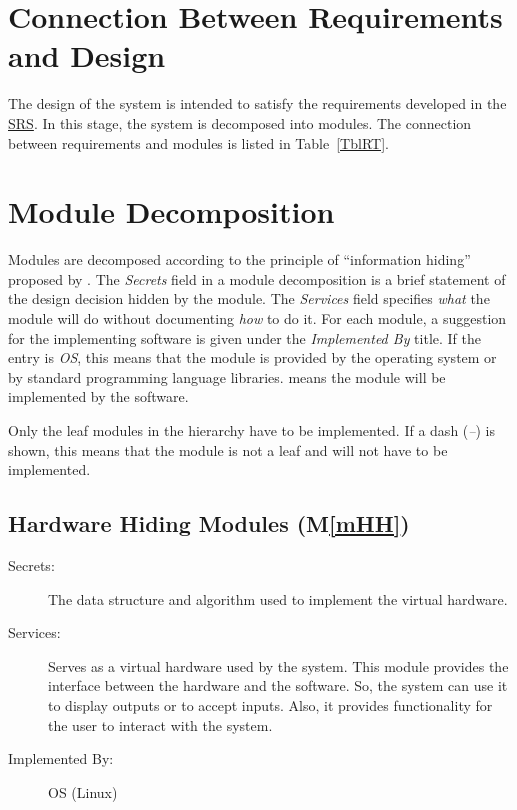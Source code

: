 \documentclass[12pt, titlepage]{article}
\newcommand{\mref}[1]{M\ref{#1}}
\begin{document}
\section{Connection Between Requirements and Design} \label{SecConnection}

The design of the system is intended to satisfy the requirements developed in
the \href{https://github.com/NicLobo/Capstone-yoGERT/blob/main/docs/SRS/SRS.pdf}{SRS}. In this stage, the system is decomposed into modules. The connection
between requirements and modules is listed in Table~\ref{TblRT}.

\section{Module Decomposition} \label{SecMD}

Modules are decomposed according to the principle of ``information hiding''
proposed by \citet{ParnasEtAl1984}. The \emph{Secrets} field in a module
decomposition is a brief statement of the design decision hidden by the
module. The \emph{Services} field specifies \emph{what} the module will do
without documenting \emph{how} to do it. For each module, a suggestion for the
implementing software is given under the \emph{Implemented By} title. If the
entry is \emph{OS}, this means that the module is provided by the operating
system or by standard programming language libraries.  \emph{\progname{}} means the
module will be implemented by the \progname{} software.

Only the leaf modules in the hierarchy have to be implemented. If a dash
(\emph{--}) is shown, this means that the module is not a leaf and will not have
to be implemented.

\subsection{Hardware Hiding Modules (\mref{mHH})}

\begin{description}
\item[Secrets:]The data structure and algorithm used to implement the virtual
  hardware.
\item[Services:]Serves as a virtual hardware used by the
  system. This module provides the interface between the hardware and the
  software. So, the system can use it to display outputs or to accept inputs. Also, it provides functionality for the user to interact with the system. 
\item[Implemented By:] OS (Linux)
\end{description}
\end{document}
